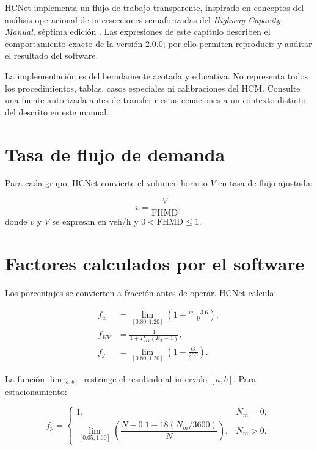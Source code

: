 \documentclass[11pt,letterpaper,oneside,openany]{report}
\newcommand{\softwareVersion}{2.0.0}
\begin{document}
HCNet implementa un flujo de trabajo transparente, inspirado en conceptos del
análisis operacional de intersecciones semaforizadas del \textit{Highway Capacity
Manual}, séptima edición \cite{hcm2022}. Las expresiones de este capítulo describen
el comportamiento exacto de la versión \softwareVersion; por ello permiten
reproducir y auditar el resultado del software.

\begin{limitbox}
La implementación es deliberadamente acotada y educativa. No representa todos
los procedimientos, tablas, casos especiales ni calibraciones del HCM. Consulte
una fuente autorizada antes de transferir estas ecuaciones a un contexto distinto
del descrito en este manual.
\end{limitbox}

\section{Tasa de flujo de demanda}

Para cada grupo, HCNet convierte el volumen horario $V$ en tasa de flujo ajustada:

\begin{equationbox}
\begin{equation}
v=\frac{V}{\mathrm{FHMD}},
\label{eq:v}
\end{equation}
donde $v$ y $V$ se expresan en veh/h y $0<\mathrm{FHMD}\leq 1$.
\end{equationbox}

\section{Factores calculados por el software}

Los porcentajes se convierten a fracción antes de operar. HCNet calcula:

\begin{align}
f_w &= \operatorname{lim}_{[0.80,1.20]}
       \left(1+\frac{w-3.6}{9}\right), \\
f_{HV} &= \frac{1}{1+P_{HV}(E_T-1)}, \\
f_g &= \operatorname{lim}_{[0.80,1.20]}
       \left(1-\frac{G}{200}\right).
\end{align}

La función $\operatorname{lim}_{[a,b]}$ restringe el resultado al intervalo
$[a,b]$. Para estacionamiento:

\begin{equation}
f_p=
\begin{cases}
1, & N_m=0,\\
\operatorname{lim}_{[0.05,1.00]}
\left(\dfrac{N-0.1-18(N_m/3600)}{N}\right), & N_m>0.
\end{cases}
\end{equation}
\end{document}
